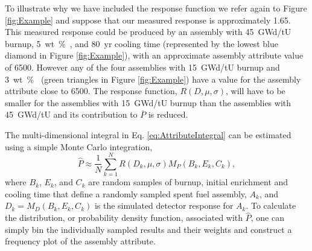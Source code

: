 \documentclass{ansnse}
\begin{document}
To illustrate why we have included the response function we refer again to Figure \ref{fig:Example} and suppose that our measured response is approximately 1.65.  This measured response could be produced by an assembly with \SI{45}{GWd/tU} burnup, \SI{5}{wt \% }, and \SI{80}{yr} cooling time (represented by the lowest blue diamond in Figure \ref{fig:Example}), with an approximate assembly attribute value of 6500.    However any of the four assemblies with \SI{15}{GWd/tU} burnup and \SI{3}{wt \% } (green triangles in Figure \ref{fig:Example}) have a value for the assembly attribute close to 6500.  The response function, $R\left(D, \mu,\sigma\right)$, will have to be smaller for the assemblies with \SI{15}{GWd/tU} burnup than the assemblies with \SI{45}{GWd/tU} and its contribution to $\overline{P}$ is reduced.

The multi-dimensional integral in Eq. \eqref{eq:AttributeIntegral} can be estimated using a simple Monte Carlo integration\cite{Lewis:1993Compu-0},
\begin{equation}
    \hat{P} \approx \frac{1}{N} \sum_{k=1}^N R(D_{k},\mu,\sigma) M_{P}(B_k, E_k, C_k),
    \label{eq:MCAttributeIntegral}
\end{equation}
where $B_{k}$, $E_{k}$, and $C_{k}$ are random samples of burnup, initial enrichment and cooling time that define a randomly sampled spent fuel assembly, $A_{k}$, and $D_{k} = M_{D}(B_{k}, E_{k}, C_{k})$ is the simulated detector response for $A_{k}$.  To calculate the distribution, or probability density function, associated with $\hat{P}$, one can simply bin the individually sampled results and their weights and construct a frequency plot of the assembly attribute.
\end{document}
